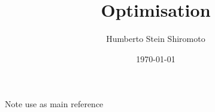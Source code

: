 \documentclass[sfsidenotes,notoc,nobib,a4paper]{tufte-book}
\title{Optimisation}
\author{Humberto Stein Shiromoto}
\date{\today}
\begin{document}
\setcounter{tocdepth}{1}
\maketitle




\tableofcontents
\adjustmtc
\printnomenclature

Note use \citep{Liberzon2012} as main reference

\appendix
%



\printbibliography[heading=bibintoc]
\printindex
\end{document}
